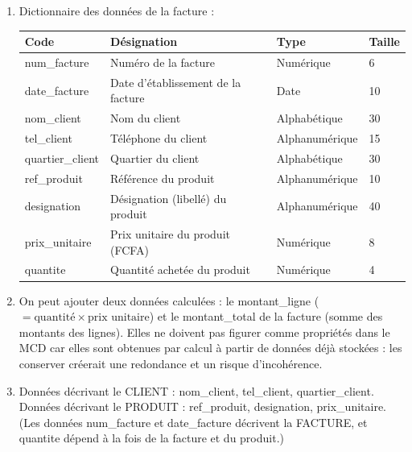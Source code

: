\documentclass[11pt]{article}
\newcommand{\cle}[1]{{\popxbold\color{popdark}#1}}
\begin{document}
\begin{corrige}
\begin{enumerate}
\item Dictionnaire des données de la facture :
\begin{center}
\begin{tabularx}{\linewidth}{|l|X|l|l|}
\hline
\rowcolor{popblueL} \textbf{Code} & \textbf{Désignation} & \textbf{Type} & \textbf{Taille} \\
\hline
num\_facture & Numéro de la facture & Numérique & 6 \\
\hline
date\_facture & Date d'établissement de la facture & Date & 10 \\
\hline
nom\_client & Nom du client & Alphabétique & 30 \\
\hline
tel\_client & Téléphone du client & Alphanumérique & 15 \\
\hline
quartier\_client & Quartier du client & Alphabétique & 30 \\
\hline
ref\_produit & Référence du produit & Alphanumérique & 10 \\
\hline
designation & Désignation (libellé) du produit & Alphanumérique & 40 \\
\hline
prix\_unitaire & Prix unitaire du produit (FCFA) & Numérique & 8 \\
\hline
quantite & Quantité achetée du produit & Numérique & 4 \\
\hline
\end{tabularx}
\end{center}
\item On peut ajouter deux données calculées : le \cle{montant\_ligne} ($= \text{quantité} \times \text{prix unitaire}$) et le \cle{montant\_total} de la facture (somme des montants des lignes). Elles ne doivent pas figurer comme propriétés dans le MCD car elles sont obtenues par calcul à partir de données déjà stockées : les conserver créerait une redondance et un risque d'incohérence.
\item Données décrivant le CLIENT : nom\_client, tel\_client, quartier\_client. Données décrivant le PRODUIT : ref\_produit, designation, prix\_unitaire. (Les données num\_facture et date\_facture décrivent la FACTURE, et quantite dépend à la fois de la facture et du produit.)
\end{enumerate}
\end{corrige}
\end{document}
